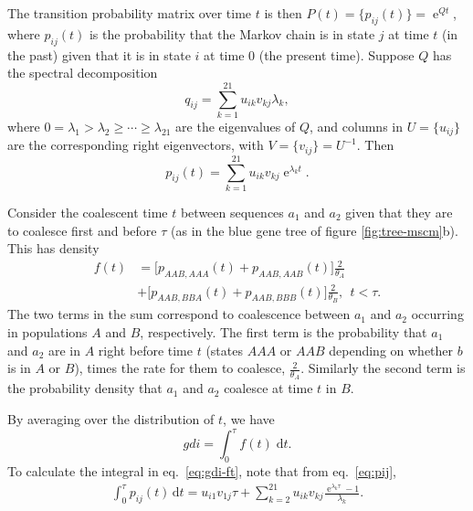 \documentclass{article1}
\renewcommand{\d}{\mathrm{d}}
\DeclareMathOperator{\e}{\mathrm{e}}
\begin{document}
The transition probability matrix over time $t$ is then $P(t) = \{p_{ij}(t)\} = \e^{Qt}$,
where $p_{ij}(t)$ is the probability that the Markov chain is in state $j$ at time $t$ (in
the past) given that it is in state $i$ at time 0 (the present time).  Suppose $Q$ has the
spectral decomposition
\begin{equation} 
    q_{ij} = \sum_{k=1}^{21} u_{ik} v_{kj} \lambda_k ,
\end{equation} 
where $0 = \lambda_1 > \lambda_2 \ge \cdots \ge \lambda_{21}$ are the eigenvalues of
$Q$, and columns in $U = \{u_{ij}\}$ are the corresponding right eigenvectors, with $V =
\{v_{ij}\} = U^{-1}$.  Then
\begin{equation} \label{eq:pij}
    p_{ij}(t) = \sum_{k=1}^{21}  u_{ik} v_{kj} \e^{\lambda_k t}.
\end{equation}

Consider the coalescent time $t$ between sequences $a_1$ and $a_2$ given that they are to
coalesce first and before $\tau$ (as in the blue gene tree of figure \ref{fig:tree-mscm}b).
This has density
\begin{equation} \label{eq:ft} 
\begin{aligned}
  f(t) &= \bigl[ p_{AAB, AAA}(t) + p_{AAB, AAB}(t) \bigr] \tfrac{2}{\theta_A} \\
       &+ \bigl[ p_{AAB, BBA}(t) + p_{AAB, BBB}(t) \bigr] \tfrac{2}{\theta_B}, \ \ t < \tau.
\end{aligned}
\end{equation} 
The two terms in the sum correspond to coalescence between $a_1$ and $a_2$ occurring in
populations $A$ and $B$, respectively.  The first term is the probability that $a_1$ and
$a_2$ are in $A$ right before time $t$ (states $AAA$ or $AAB$ depending on whether $b$ is
in $A$ or $B$), times the rate for them to coalesce, $\frac{2}{\theta_A}$. Similarly the
second term is the probability density that $a_1$ and $a_2$ coalesce at time $t$ in $B$.

By averaging over the distribution of $t$, we have 
\begin{equation} \label{eq:gdi-ft} 
    gdi = \int_0^\tau f(t) \; \d t .
\end{equation}
To calculate the integral in eq.~\ref{eq:gdi-ft}, note that from eq.~\ref{eq:pij},
\begin{equation} 
   \begin{aligned}
      \int_0^\tau p_{ij}(t) \,\d t = 
       u_{i1} v_{1j}\tau %
       + \sum_{k=2}^{21} u_{ik} v_{kj} \frac{\e^{\lambda_k \tau} - 1}{\lambda_k} .
   \end{aligned}
\end{equation}
\end{document}
